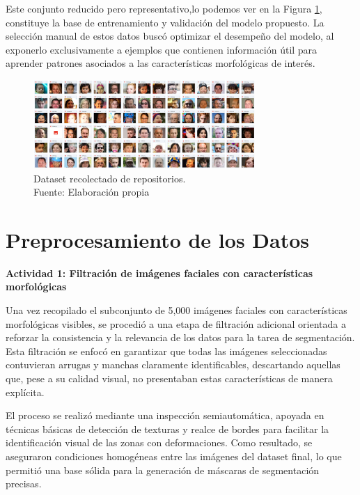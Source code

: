 Este conjunto reducido pero representativo,lo podemos ver en la Figura \ref{4:fig1}, constituye la base de entrenamiento y validación del modelo propuesto. La selección manual de estos datos buscó optimizar el desempeño del modelo, al exponerlo exclusivamente a ejemplos que contienen información útil para aprender patrones asociados a las características morfológicas de interés.

\begin{figure}[h]
	\begin{center}
		\includegraphics[width=0.75\textwidth]{4/figures/data.png}
		\caption[Dataset recolectado de repositorios]{Dataset recolectado de repositorios.\\
		Fuente: Elaboración propia}
		\label{4:fig1}
	\end{center}
\end{figure}

\section{Preprocesamiento de los Datos}

\textbf{Actividad 1: Filtración de imágenes faciales con características morfológicas}

Una vez recopilado el subconjunto de 5,000 imágenes faciales con características morfológicas visibles, se procedió a una etapa de filtración adicional orientada a reforzar la consistencia y la relevancia de los datos para la tarea de segmentación. Esta filtración se enfocó en garantizar que todas las imágenes seleccionadas contuvieran arrugas y manchas claramente identificables, descartando aquellas que, pese a su calidad visual, no presentaban estas características de manera explícita.

El proceso se realizó mediante una inspección semiautomática, apoyada en técnicas básicas de detección de texturas y realce de bordes para facilitar la identificación visual de las zonas con deformaciones. Como resultado, se aseguraron condiciones homogéneas entre las imágenes del dataset final, lo que permitió una base sólida para la generación de máscaras de segmentación precisas.

